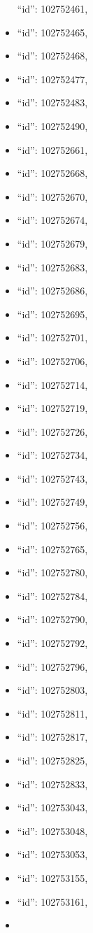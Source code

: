 \begin{itemize}
  ``id'': 102752461,
\item
  ``id'': 102752465,
\item
  ``id'': 102752468,
\item
  ``id'': 102752477,
\item
  ``id'': 102752483,
\item
  ``id'': 102752490,
\item
  ``id'': 102752661,
\item
  ``id'': 102752668,
\item
  ``id'': 102752670,
\item
  ``id'': 102752674,
\item
  ``id'': 102752679,
\item
  ``id'': 102752683,
\item
  ``id'': 102752686,
\item
  ``id'': 102752695,
\item
  ``id'': 102752701,
\item
  ``id'': 102752706,
\item
  ``id'': 102752714,
\item
  ``id'': 102752719,
\item
  ``id'': 102752726,
\item
  ``id'': 102752734,
\item
  ``id'': 102752743,
\item
  ``id'': 102752749,
\item
  ``id'': 102752756,
\item
  ``id'': 102752765,
\item
  ``id'': 102752780,
\item
  ``id'': 102752784,
\item
  ``id'': 102752790,
\item
  ``id'': 102752792,
\item
  ``id'': 102752796,
\item
  ``id'': 102752803,
\item
  ``id'': 102752811,
\item
  ``id'': 102752817,
\item
  ``id'': 102752825,
\item
  ``id'': 102752833,
\item
  ``id'': 102753043,
\item
  ``id'': 102753048,
\item
  ``id'': 102753053,
\item
  ``id'': 102753155,
\item
  ``id'': 102753161,
\item

\end{itemize}
